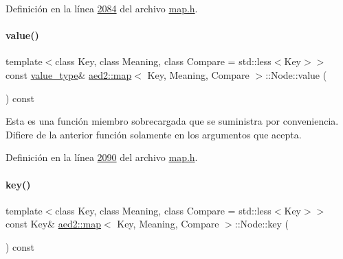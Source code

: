 Definición en la línea \hyperlink{map_8h_source_l02084}{2084} del archivo \hyperlink{map_8h_source}{map.\+h}.

\mbox{\label{structaed2_1_1map_1_1Node_ab66a33cedd0ba5cc20e366d4769184ae_ab66a33cedd0ba5cc20e366d4769184ae}} 
\paragraph{\texorpdfstring{value()}{value()}\hspace{0.1cm}{\footnotesize\ttfamily [2/2]}}
{\footnotesize\ttfamily template$<$class Key, class Meaning, class Compare = std\+::less$<$\+Key$>$$>$ \\
const \hyperlink{classaed2_1_1map_a719db98e0ff9a837610f76be33264680_a719db98e0ff9a837610f76be33264680}{value\+\_\+type}\& \hyperlink{classaed2_1_1map}{aed2\+::map}$<$ Key, Meaning, Compare $>$\+::Node\+::value (\begin{DoxyParamCaption}{ }\end{DoxyParamCaption}) const\hspace{0.3cm}{\ttfamily [inline]}}

Esta es una función miembro sobrecargada que se suministra por conveniencia. Difiere de la anterior función solamente en los argumentos que acepta. 

Definición en la línea \hyperlink{map_8h_source_l02090}{2090} del archivo \hyperlink{map_8h_source}{map.\+h}.

\mbox{\label{structaed2_1_1map_1_1Node_a08fd071b9bba8048526b8da7e8d73831_a08fd071b9bba8048526b8da7e8d73831}} 
\paragraph{\texorpdfstring{key()}{key()}}
{\footnotesize\ttfamily template$<$class Key, class Meaning, class Compare = std\+::less$<$\+Key$>$$>$ \\
const Key\& \hyperlink{classaed2_1_1map}{aed2\+::map}$<$ Key, Meaning, Compare $>$\+::Node\+::key (\begin{DoxyParamCaption}{ }\end{DoxyParamCaption}) const\hspace{0.3cm}{\ttfamily [inline]}}



